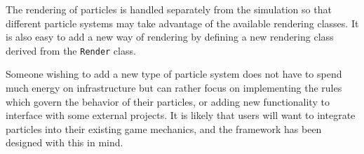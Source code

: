 The rendering of particles is handled separately from the simulation so that
different particle systems may take advantage of the available rendering
classes. It is also easy to add a new way of rendering by defining a new
rendering class derived from the \verb|Render| class.


Someone wishing to add a new type of particle system does not have to spend
much energy on infrastructure but can rather focus on implementing the rules
which govern the behavior of their particles, or adding new functionality to
interface with some external projects. It is likely that users will want to
integrate particles into their existing game mechanics, and the framework has
been designed with this in mind.




